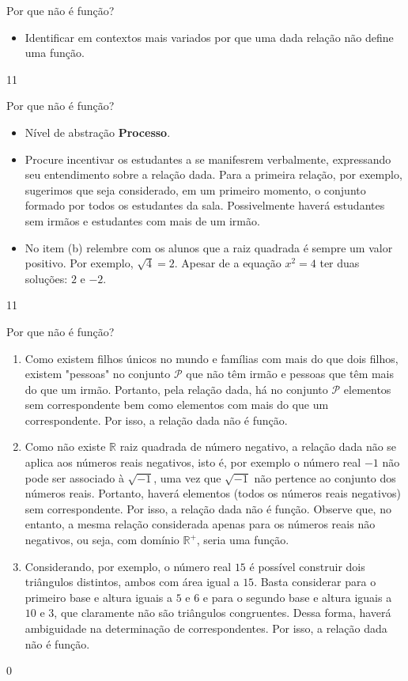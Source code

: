 \clearpage
\def\currentcolor{session3}
\begin{objectives}{Por que não é função?}
{
\begin{itemize}

\item Identificar em contextos mais variados por que uma dada relação não define uma função.

\end{itemize}
}{1}{1}
\end{objectives}
\begin{sugestions}{Por que não é função?}
{
\begin{itemize}
\item Nível de abstração \textbf{Processo}.

\item Procure incentivar os estudantes a se manifesrem verbalmente, expressando seu entendimento sobre a relação dada. Para a primeira relação, por exemplo, sugerimos que seja considerado, em um primeiro momento, o conjunto formado por todos os estudantes da sala. Possivelmente haverá estudantes sem irmãos e estudantes com mais de um irmão.

\item No item (b) relembre com os alunos que a raiz quadrada é sempre um valor positivo. Por exemplo, $\sqrt{4}=2$. Apesar de a equação $x^2=4$ ter duas soluções: $2$ e $−2$.
\end{itemize}
}{1}{1}
\end{sugestions}
\begin{answer}{Por que não é função?}
{
\begin{enumerate}
\item Como existem filhos únicos no mundo e famílias com mais do que dois filhos, existem "pessoas" no conjunto $\mathcal{P}$ que não têm irmão e pessoas que têm mais do que um irmão. Portanto, pela relação dada, há no conjunto $\mathcal{P}$ elementos sem correspondente bem como elementos com mais do que um correspondente. Por isso, a relação dada não é função.

\item Como não existe $\mathbb{R}$ raiz quadrada de número negativo, a relação dada não se aplica aos números reais negativos, isto é, por exemplo o número real $-1$ não pode ser associado à $\sqrt{-1}$, uma vez que $\sqrt{-1}$ não pertence ao conjunto dos números reais. Portanto, haverá elementos (todos os números reais negativos) sem correspondente. Por isso, a relação dada não é função. Observe que, no entanto, a mesma relação considerada apenas para os números reais não negativos, ou seja, com domínio $\mathbb{R}^+$, seria uma função.

\item Considerando, por exemplo, o número real $15$ é possível construir dois triângulos distintos, ambos com área igual a $15$. Basta considerar para o primeiro base e altura iguais a $5$ e $6$ e para o segundo base e altura iguais a $10$ e $3$, que claramente não são triângulos congruentes. Dessa forma, haverá ambiguidade na determinação de correspondentes. Por isso, a relação dada não é função.

\end{enumerate}
}{0}
\end{answer}
